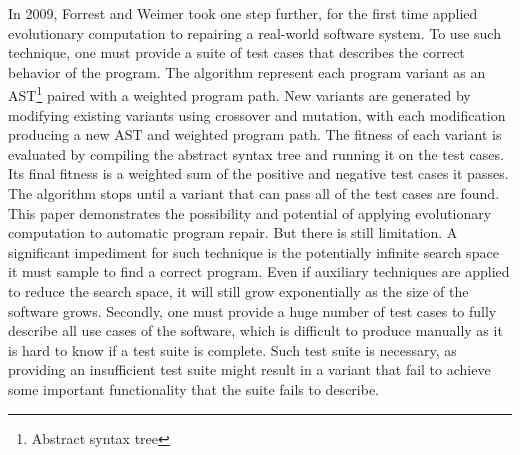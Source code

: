 In 2009, Forrest and Weimer took one step further, for the first time applied evolutionary computation to repairing a real-world software system\cite{AGPAtASR,AFPUGP}.
To use such technique, one must provide a suite of test cases that describes the correct behavior of the program. The algorithm represent each program variant as an AST\footnote{Abstract syntax tree} paired with a weighted program path. New variants are generated by modifying existing variants using crossover and mutation, with each modification producing a new AST and weighted program path. The fitness of each variant is evaluated by compiling the abstract syntax tree and running it on the test cases. Its final fitness is a weighted sum of the positive and negative test cases it passes.
The algorithm stops until a variant that can pass all of the test cases are found.
This paper demonstrates the possibility and potential of applying evolutionary computation to automatic program repair.
But there is still limitation.
A significant impediment for such technique is the potentially infinite search space it must sample to find a correct program. Even if auxiliary techniques are applied to reduce the search space,
it will still grow exponentially as the size of the software grows.
Secondly, one must provide a huge number of test cases to fully describe all use cases of the software, which is difficult to produce manually as it is hard to know if a test suite is complete.
Such test suite is necessary, as providing an insufficient test suite might result in a variant that fail to achieve some important functionality that the suite fails to describe.

